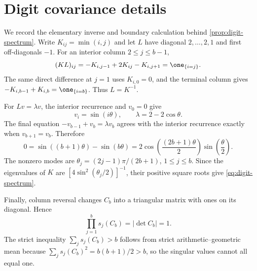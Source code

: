 \section{Digit covariance details}
\label{app:digit}

We record the elementary inverse and boundary calculation behind
\cref{prop:digit-spectrum}.  Write \(K_{ij}=\min(i,j)\) and let \(L\) have
diagonal \(2,\ldots,2,1\) and first off-diagonals \(-1\).  For an interior
column \(2\le j\le b-1\),
\[
  (KL)_{ij}
  =
  -K_{i,j-1}+2K_{ij}-K_{i,j+1}
  =
  \one_{\{i=j\}}.
\]
The same direct difference at \(j=1\) uses \(K_{i,0}=0\), and the terminal
column gives \(-K_{i,b-1}+K_{i,b}=\one_{\{i=b\}}\).  Thus \(L=K^{-1}\).

For \(Lv=\lambda v\), the interior recurrence and \(v_0=0\) give
\[
  v_i=\sin(i\theta),
  \qquad
  \lambda=2-2\cos\theta.
\]
The final equation \(-v_{b-1}+v_b=\lambda v_b\) agrees with the interior
recurrence exactly when \(v_{b+1}=v_b\).  Therefore
\[
  0=\sin((b+1)\theta)-\sin(b\theta)
   =2\cos(\frac{(2b+1)\theta}{2})
      \sin(\frac{\theta}{2}).
\]
The nonzero modes are
\(\theta_j=(2j-1)\pi/(2b+1)\), \(1\le j\le b\).
Since the eigenvalues of \(K\) are
\([4\sin^2(\theta_j/2)]^{-1}\), their positive square roots give
\cref{eq:digit-spectrum}.

Finally, column reversal changes \(C_b\) into a triangular matrix with
ones on its diagonal.  Hence
\[
  \prod_{j=1}^{b}s_j(C_b)=|\det C_b|=1.
\]
The strict inequality \(\sum_js_j(C_b)>b\) follows from strict
arithmetic--geometric mean because
\(\sum_js_j(C_b)^2=b(b+1)/2>b\), so the singular values cannot all equal
one.
